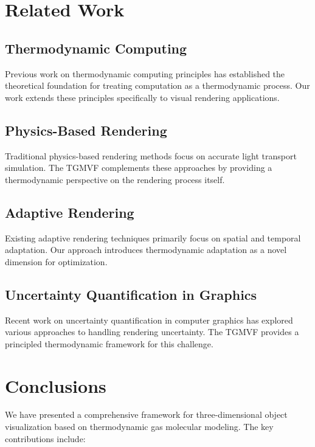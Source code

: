 \documentclass[12pt,a4paper]{article}
\begin{document}
\section{Related Work}

\subsection{Thermodynamic Computing}

Previous work on thermodynamic computing principles \cite{bennett1982thermodynamics, landauer1961irreversibility} has established the theoretical foundation for treating computation as a thermodynamic process. Our work extends these principles specifically to visual rendering applications.

\subsection{Physics-Based Rendering}

Traditional physics-based rendering methods \cite{pharr2016physically, kajiya1986rendering} focus on accurate light transport simulation. The TGMVF complements these approaches by providing a thermodynamic perspective on the rendering process itself.

\subsection{Adaptive Rendering}

Existing adaptive rendering techniques \cite{ward1994adaptive, walter2005lightcuts} primarily focus on spatial and temporal adaptation. Our approach introduces thermodynamic adaptation as a novel dimension for optimization.

\subsection{Uncertainty Quantification in Graphics}

Recent work on uncertainty quantification in computer graphics \cite{zwicker2015recent} has explored various approaches to handling rendering uncertainty. The TGMVF provides a principled thermodynamic framework for this challenge.

\section{Conclusions}

We have presented a comprehensive framework for three-dimensional object visualization based on thermodynamic gas molecular modeling. The key contributions include:
\end{document}
